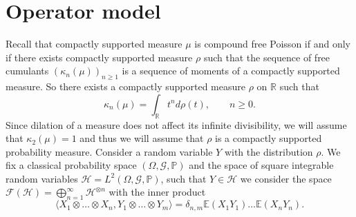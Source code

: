 \documentclass{amsart}
\newcommand{\bE}{\mathbb{E}}
\begin{document}
%
%
%
%
%

\section{Operator model}


Recall that compactly supported measure $\mu$ is compound free Poisson if and only if there exists compactly supported measure $\rho$ such that the sequence of free cumulants $(\kappa_n(\mu))_{n\geq 1}$ is a sequence of moments of a compactly supported measure. So there exists a compactly supported measure $\rho$ on $\mathbb{R}$ such that
\[\kappa_{n}(\mu)=\int_{\mathbb{R}} t^n d\rho(t),\qquad n\geq 0.\] 
Since dilation of a measure does not affect its infinite divisibility, we will assume that $\kappa_2(\mu)=1$ and thus we will assume that $\rho$ is a compactly supported probability measure. Consider a random variable $Y$ with the distribution $\rho$. We fix a classical probability space $(\Omega,\mathcal{G},\mathbb{P})$ and the space of square integrable random variables $\mathcal{H}=L^2(\Omega,\mathcal{G},\mathbb{P})$, such that $Y\in\mathcal{H}$ we consider the space $\mathcal{F}(\mathcal{H})=\bigoplus_{n=1}^{\infty}  \mathcal{H}^{\otimes n}$ with the inner product 
\[\langle X_1\otimes\ldots\otimes X_n,Y_1\otimes\ldots\otimes Y_m\rangle=\delta_{n,m}\bE(X_1 Y_1)\ldots \bE(X_n Y_n).
\]
\end{document}
